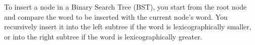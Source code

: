 \documentclass[preview]{standalone}
\begin{document}
To insert a node in a Binary Search Tree (BST), you start from the root node and compare the word to be inserted with the current node's word. You recursively insert it into the left subtree if the word is lexicographically smaller, or into the right subtree if the word is lexicographically greater.\\
\end{document}
